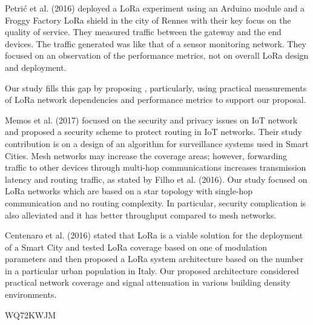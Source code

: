 Petrić et al.
(2016) deployed a LoRa experiment using an Arduino module and a Froggy Factory LoRa shield in the city of Rennes with their key focus on the quality of service.
They measured traffic between the gateway and the end devices.
The traffic generated was like that of a sensor monitoring network.
They focused on an observation of the performance metrics,
	not on overall LoRa design and deployment.

Our study fills this gap by proposing \cite{chen_viable_2018},
	particularly,
	using practical measurements of LoRa network dependencies and performance metrics to support our proposal.

Memos et al.
(2017) focused on the security and privacy issues on IoT network and proposed a security scheme to protect routing in IoT networks.
Their study contribution is on a design of an algorithm for surveillance systems used in Smart Cities.
Mesh networks may increase the coverage areas;
	however,
	forwarding traffic to other devices through multi-hop communications increases transmission latency and routing traffic,
	as stated by Filho et al.
(2016).
Our study focused on LoRa networks which are based on a star topology with single-hop communication and no routing complexity.
In particular,
	security complication is also alleviated and it has better throughput compared to mesh networks.

Centenaro et al.
(2016) stated that LoRa is a viable solution for the deployment of a Smart City and tested LoRa coverage based on one of modulation parameters and then proposed a LoRa system architecture based on the number in a particular urban population in Italy.
Our proposed architecture considered practical network coverage and signal attenuation in various building density environments.

\cite{dawaliby_adaptive_2019} WQ72KWJM

